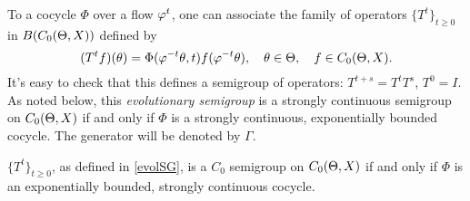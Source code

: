 To a cocycle $\Phi$ over a flow $\varphi^t$, one can
associate the family of operators $\{T^t\}_{t\ge 0}$ in $B(C_0(\Theta,X))$
defined by
\begin{equation}\lb{evolSG}
(T^tf)(\th)=\Phi(\vphi^{-t}\th,t)f(\vphi^{-t}\th),\quad \th\in \TH,
\quad f\in\co.
\end{equation}
It's easy to check that this defines a semigroup of operators:
$T^{t+s}=T^tT^s$, $T^0=I$.  As noted below, this {\em evolutionary
semigroup} is a strongly continuous
semigroup on $C_0(\Theta,X)$ if and only if $\Phi$ is a strongly continuous,
exponentially bounded cocycle.  The generator will be denoted by
$\Gamma$.

\begin{thm}
$\{T^t\}_{t\ge 0}$, as defined in \eqref{evolSG},
is a $C_0$ semigroup
on $C_0(\Theta,X)$ if and only if $\Phi$ is an exponentially bounded,
strongly continuous cocycle.
\end{thm}

